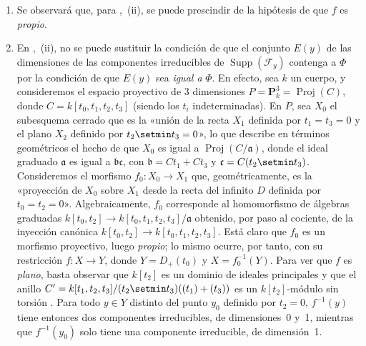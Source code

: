 \begin{remarks}[12.2.3]
\label{IV.12.2.3}
\begin{enumerate}[label=(\roman*)]
  \item Se observará que, para ,~(ii), se puede prescindir de la hipótesis de que $f$ es \emph{propio}.

  \item En ,~(ii), no se puede sustituir la condición de que el conjunto $E(y)$ de las dimensiones de las componentes irreducibles de $\operatorname{Supp}(\mathcal F_y)$ contenga a $\Phi$ por la condición de que $E(y)$ sea \emph{igual a} $\Phi$.
En efecto, sea $k$ un cuerpo, y consideremos el espacio proyectivo de 3 dimensiones $P=\mathbf P^3_k=\operatorname{Proj}(C)$, donde $C=k[t_0,t_1,t_2,t_3]$ (siendo los $t_i$ indeterminadas). En $P$, sea $X_0$ el subesquema cerrado que es la «unión de la recta $X_1$ definida por $t_1=t_3=0$ y el plano $X_2$ definido por $t_2\setmin t_3=0$», lo que describe en términos geométricos
el hecho de que $X_0$ es igual a $\operatorname{Proj}(C/\mathfrak a)$, donde el ideal
graduado $\mathfrak a$ es igual a $\mathfrak b\mathfrak c$, con $\mathfrak b=Ct_1+Ct_3$ y $\mathfrak c=C(t_2\setmin t_3)$. Consideremos el morfismo $f_0:X_0\to X_1$ que, geométricamente, es la «proyección de $X_0$ sobre $X_1$ desde la recta del infinito $D$ definida por $t_0=t_2=0$». Algebraicamente, $f_0$ corresponde al homomorfismo de álgebras graduadas
$k[t_0,t_2]\longrightarrow k[t_0,t_1,t_2,t_3]/\mathfrak a$
obtenido, por paso al cociente, de la inyección canónica $k[t_0,t_2]\to k[t_0,t_1,t_2,t_3]$.
Está claro que $f_0$ es un morfismo proyectivo, luego \emph{propio}; lo mismo ocurre, por tanto, con su restricción $f:X\to Y$, donde $Y=D_+(t_0)$ y $X=f_0^{-1}(Y)$. Para ver que $f$ es \emph{plano}, basta observar que $k[t_2]$ es un dominio de ideales principales y que el anillo
$C'=k[t_1,t_2,t_3]/(t_2\setmin t_3)((t_1)+(t_3))$
es un $k[t_2]$-módulo sin torsión .
Para todo $y\in Y$ distinto del punto $y_0$ definido por $t_2=0$, $f^{-1}(y)$ tiene entonces dos componentes irreducibles, de dimensiones~0 y~1, mientras que $f^{-1}(y_0)$ solo tiene una componente irreducible, de dimensión~1.


\end{enumerate}
\end{remarks}
